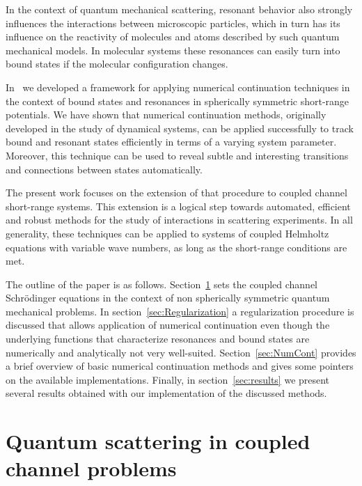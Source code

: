 \documentclass[mathpazo]{cicp}
\begin{document}
In the context of quantum mechanical scattering, resonant behavior also strongly influences the interactions between microscopic particles, which in turn 
has its influence on the reactivity of molecules and atoms described by such quantum mechanical models.  In molecular systems these resonances can 
easily turn into bound states if the molecular configuration changes. 

In~\cite{Broeckhove2009} we developed a framework for applying numerical continuation techniques in the context of bound states and resonances 
in spherically symmetric short-range potentials. We have shown that numerical continuation methods, originally developed in the study of dynamical 
systems, can be applied successfully to track bound and resonant states efficiently in terms of a varying system parameter. Moreover, this technique 
can be used to reveal subtle and interesting transitions and connections between states automatically.

The present work focuses on the extension of that procedure to coupled channel short-range systems. This extension is a logical step towards automated, 
efficient and robust methods for the study of interactions in scattering experiments. In all generality, these techniques can be applied to systems of 
coupled Helmholtz equations with variable wave numbers, as long as the short-range conditions are met.

The outline of the paper is as follows. Section~\ref{sec:Scattering} sets the coupled channel Schr\"o\-din\-ger equations in the context of non spherically 
symmetric quantum mechanical problems. In section~\ref{sec:Regularization} a regularization procedure is discussed that allows application of numerical 
continuation even though the underlying functions that characterize resonances and bound states are numerically and analytically not very well-suited. 
Section~\ref{sec:NumCont} provides a brief overview of basic numerical continuation methods and gives some pointers on the available implementations. 
Finally, in section~\ref{sec:results} we present several results obtained with our implementation of the discussed methods.

\section{Quantum scattering in coupled channel problems}
\label{sec:Scattering}
\end{document}
